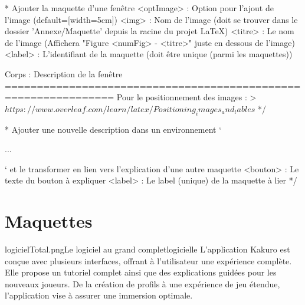 
\/*	Ajouter la maquette d'une fenêtre
	<optImage> : Option pour l'ajout de l'image (default=[width=5cm])
	<img> : Nom de l'image (doit se trouver dans le dossier 'Annexe/Maquette' depuis la racine du projet LaTeX)
	<titre> : Le nom de l'image (Affichera "Figure <numFig> - <titre>" juste en dessous de l'image)
	<label> : L'identifiant de la maquette (doit être unique (parmi les maquettes))


	Corps : Description de la fenêtre
    ===============================================================
    Pour le positionnement des images :
    > $https://www.overleaf.com/learn/latex/Positioning_images_and_tables$
*/

\/*	Ajouter une nouvelle description dans un environnement `\begin{description}...\end{description}` et le transformer en lien vers l'explication d'une autre maquette
    <bouton> : Le texte du bouton à expliquer
    <label> : Le label (unique) de la maquette à lier
*/

\vspace{-1cm}
\section{Maquettes}
\vspace{-1cm}

\begin{maquette}[width=15cm]{logicielTotal.png}{Le logiciel au grand complet}{logicielle}
    L'application Kakuro est conçue avec plusieurs interfaces, offrant à l'utilisateur une expérience complète. Elle propose un tutoriel complet ainsi que des explications guidées pour les nouveaux joueurs. De la création de profils à une expérience de jeu étendue, l'application vise à assurer une immersion optimale.
\end{maquette}

